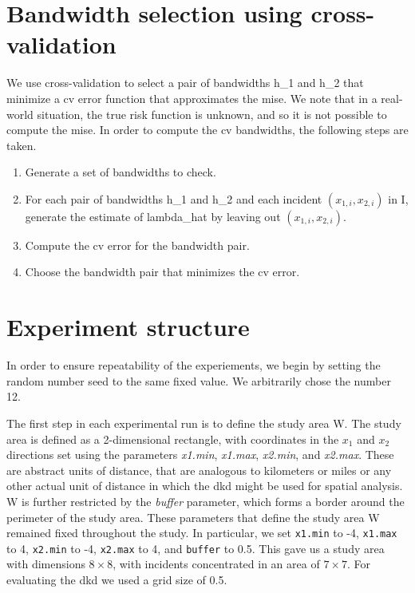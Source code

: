 \section{Bandwidth selection using cross-validation}
\label{sec:method:cross-validation}

We use cross-validation to select a pair of bandwidths \gls{h_1} and \gls{h_2} that minimize a \gls{cv} error function that approximates the \gls{mise}.
We note that in a real-world situation, the true risk function is unknown, and so it is not possible to compute the \gls{mise}.
In order to compute the \gls{cv} bandwidths, the following steps are taken.
\begin{enumerate}
    \item Generate a set of bandwidths to check.
    \item For each pair of bandwidths \gls{h_1} and \gls{h_2} and each incident \((x_{1,i}, x_{2,i})\) in \gls{I}, generate the estimate of \gls{lambda_hat} by leaving out \((x_{1,i}, x_{2,i})\).
    \item Compute the \gls{cv} error for the bandwidth pair.
    \item Choose the bandwidth pair that minimizes the \gls{cv} error.
\end{enumerate}


\section{Experiment structure}
\label{sec:method:experiment_structure}

In order to ensure repeatability of the experiements, we begin by setting the random number seed to the same fixed value.
We arbitrarily chose the number 12.

The first step in each experimental run is to define the study area \gls{W}. 
The study area is defined as a 2-dimensional rectangle, with coordinates in the \(x_1\) and \(x_2\) directions set using the parameters \textit{x1.min}, \textit{x1.max}, \textit{x2.min}, and \textit{x2.max}.
These are abstract units of distance, that are analogous to kilometers or miles or any other actual unit of distance in which the \gls{dkd} might be used for spatial analysis.
\Gls{W} is further restricted by the \textit{buffer} parameter, which forms a border around the perimeter of the study area.
These parameters that define the study area \gls{W} remained fixed throughout the study.
In particular, we set \texttt{x1.min} to -4, \texttt{x1.max} to 4, \texttt{x2.min} to -4, \texttt{x2.max} to 4, and \texttt{buffer} to 0.5.
This gave us a study area with dimensions \(8 \times 8\), with incidents concentrated in an area of \(7 \times 7\).
For evaluating the \gls{dkd} we used a grid size of 0.5.


